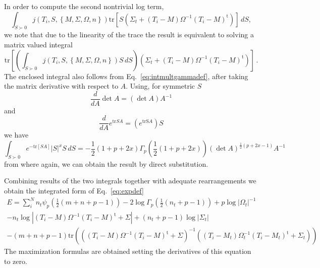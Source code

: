 \documentclass[english,listof=totoc]{scrartcl}
\begin{document}
In order to compute the second nontrivial log term,
\begin{equation}
\int_{S\succ 0}j\left(T_{i},S,\left\{M,\Sigma,\Omega,n\right\}\right)\textrm{tr}\left[S(\Sigma_{t}+(T_{i}-M)\Omega^{-1}(T_{i}-M)^{\textrm{t}})\right]\,dS,
\end{equation}
we note that due to the linearity of the trace the result is equivalent to solving a matrix valued integral
\begin{equation}
\textrm{tr}\left[\left(\int_{S\succ 0}j\left(T_{i},S,\left\{M,\Sigma,\Omega,n\right\}\right)S\,dS\right)(\Sigma_{t}+(T_{i}-M)\Omega^{-1}(T_{i}-M)^{\textrm{t}})\right]\,.
\end{equation}
The enclosed integral also follows from Eq.~\eqref{eq:intmultgammadef}, after taking the matrix derivative with respect to $A$. Using, for symmetric $S$
\begin{equation}
\frac{d}{dA}\det A=(\det A)A^{-1}\label{eq:detderivative}
\end{equation}
and
\begin{equation}
\frac{d}{dA}e^{\textrm{tr}SA}=(e^{\textrm{trS}A})S
\end{equation}
we have 
\begin{equation}
\int_{S\succ 0}e^{-\textrm{tr}\left[SA\right]}|S|^{x}S\,dS=-\frac{1}{2}(1+p+2x)\Gamma_{p}\left(\frac{1}{2}(1+p+2x)\right)(\det A)^{\frac{1}{2}(p+2x-1)}A^{-1}
\end{equation}
from where again, we can obtain the result by direct substitution.

Combining results of the two integrals together with adequate rearrangements we obtain the integrated form of Eq.~\eqref{eq:expdef}
\begin{equation}
\begin{split}E=\sum_{i}^{N}n_{t}\psi_{p}\left(\frac{1}{2}(m+n+p-1)\right)-2\log\Gamma_{p}\left(\frac{1}{2}(n_{t}+p-1)\right)+p\log|\Omega_{t}|^{-1}\\
-n_{t}\log|(T_{i}-M)\Omega^{-1}(T_{i}-M)^{\textrm{t}}+\Sigma|+(n_{t}+p-1)\log |\Sigma_{t}|\\
-(m+n+p-1)\textrm{tr}\left(\left((T_{i}-M)\Omega^{-1}(T_{i}-M)^{\textrm{t}}+\Sigma\right)^{-1}\left((T_{i}-M_{t})\Omega_{t}^{-1}(T_{i}-M_{t})^{\textrm{t}}+\Sigma_{t}\right)\right)
\end{split}
\label{eq:fsimp}
\end{equation}
The maximization formulas are obtained setting the derivatives of this equation to zero.
\end{document}

